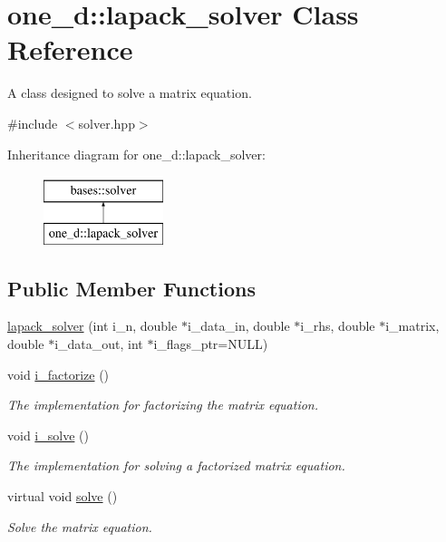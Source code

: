 \hypertarget{classone__d_1_1lapack__solver}{\section{one\-\_\-d\-:\-:lapack\-\_\-solver Class Reference}
\label{classone__d_1_1lapack__solver}
}


A class designed to solve a matrix equation.  




{\ttfamily \#include $<$solver.\-hpp$>$}

Inheritance diagram for one\-\_\-d\-:\-:lapack\-\_\-solver\-:\begin{figure}[H]
\begin{center}
\leavevmode
\includegraphics[height=2.000000cm]{classone__d_1_1lapack__solver}
\end{center}
\end{figure}
\subsection*{Public Member Functions}
\begin{DoxyCompactItemize}
\item 
\hyperlink{classone__d_1_1lapack__solver_a90054189d5a8d6d6c83471d82fffe5b2}{lapack\-\_\-solver} (int i\-\_\-n, double $\ast$i\-\_\-data\-\_\-in, double $\ast$i\-\_\-rhs, double $\ast$i\-\_\-matrix, double $\ast$i\-\_\-data\-\_\-out, int $\ast$i\-\_\-flags\-\_\-ptr=N\-U\-L\-L)
\begin{DoxyCompactList}\small\item\em \end{DoxyCompactList}\item 
void \hyperlink{classone__d_1_1lapack__solver_ac3a24df2dbfc5ce2ff26227c501b3e50}{i\-\_\-factorize} ()
\begin{DoxyCompactList}\small\item\em The implementation for factorizing the matrix equation. \end{DoxyCompactList}\item 
void \hyperlink{classone__d_1_1lapack__solver_a1e6baae0ecf3ff09f035b2da62aa011a}{i\-\_\-solve} ()
\begin{DoxyCompactList}\small\item\em The implementation for solving a factorized matrix equation. \end{DoxyCompactList}\item 
virtual void \hyperlink{classbases_1_1solver_ac33752732436d880f3b44a6c3661efc6}{solve} ()
\begin{DoxyCompactList}\small\item\em Solve the matrix equation. \end{DoxyCompactList}\end{DoxyCompactItemize}
